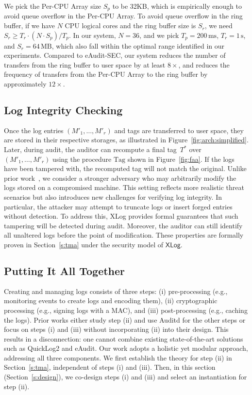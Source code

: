 \documentclass[sigconf]{sty/acmart}
\newcommand{\qltwo}{QuickLog2\xspace}
\newcommand{\ed}{eAudit\xspace}
\newcommand{\xlog}{XLog\xspace}
\newcommand{\secref}[1]{Section~\ref{#1}}
\newcommand{\figref}[1]{Figure~\ref{#1}}
\newcommand{\Agg}{\mathrm{Tag}}
\begin{document}
We pick the Per-CPU Array size \(S_p\) to be 32KB, which is empirically enough to avoid queue overflow in the Per-CPU Array. To avoid queue overflow in the ring buffer, if we have \(N\) CPU logical cores and the ring buffer size is \(S_r\), we need \(S_r \geq T_r \cdot (N \cdot S_p) / T_p\). In our system, \(N = 36\), and we pick \(T_p = 200\,\text{ms}\), \(T_r = 1\,\text{s}\), and \(S_r = 64\,\text{MB}\), which also fall within the optimal range identified in our experiments. Compared to eAudit-SEC, our system reduces the number of transfers from the ring buffer to user space by at least \(8\times\), and reduces the frequency of transfers from the Per-CPU Array to the ring buffer by approximately \(12\times\).


\subsection{Log Integrity Checking}

Once the log entries $(M'_1, \ldots, M'_r)$ and tags are transferred to user space, they are stored in their respective storages, as illustrated in Figure~\ref{fig:arch:simplified}. Later, during audit, the auditor can recompute a final tag~$T^*$ over $(M'_1, \ldots, M'_r)$ using the procedure $\Agg$ shown in \figref{fig:faa}. If the logs have been tampered with, the recomputed tag will not match the original. Unlike prior work~\cite{kennylog}, we consider a stronger adversary who may arbitrarily modify the logs stored on a compromised machine. This setting reflects more realistic threat scenarios but also introduces new challenges for verifying log integrity. In particular, the attacker may attempt to truncate logs or insert forged entries without detection.
To address this, \xlog provides formal guarantees that such tampering will be detected during audit. Moreover, the auditor can still identify all unaltered logs before the point of modification. These properties are formally proven in Section~\ref{s:tma} under the security model of \(\mathsf{XLog}\).


\subsection{Putting It All Together}

Creating and managing logs consists of three steps: (i) pre-processing (e.g., monitoring events to create logs and encoding them), (ii) cryptographic processing (e.g., signing logs with a MAC), and (iii) post-processing (e.g., caching the logs). Prior works either study step (ii) and use Auditd for the other steps or focus on steps (i) and (iii) without incorporating (ii) into their design. This results in a disconnection: one cannot combine existing state-of-the-art solutions such as \qltwo and \ed. Our work adopts a holistic yet modular approach, addressing all three components. We first establish the theory for step (ii) in \secref{s:tma}, independent of steps (i) and (iii). Then, in this section (\secref{s:design}), we co-design steps (i) and (iii) and select an instantiation for step (ii).
\end{document}

